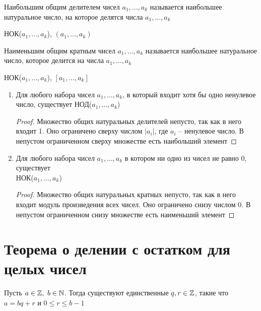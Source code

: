 \begin{definition}
	Наибольшим общим делителем чисел $a_1, ..., a_k$ называется наибольшее натуральное число, на которое делятся числа $a_1, ..., a_k$
	\begin{notation}
		НОК($a_1, ..., a_k$), $(a_1, ..., a_k)$
	\end{notation}
\end{definition}

\begin{definition}
	Наименьшим общим кратным чисел $a_1, ..., a_k$ называется наибольшее натуральное число, которое делится на числа $a_1, ..., a_k$
	\begin{notation}
		НОК($a_1, ..., a_k$), $[a_1, ..., a_k]$
	\end{notation}
\end{definition}

\begin{theorem}
	\hfill
	\begin{enumerate}
		\item Для любого набора чисел $a_1, ..., a_k$, в который входит хотя бы одно ненулевое число, существует НОД($a_1, ..., a_k$)
		\begin{proof}
			Множество общих натуральных делителей непусто, так как в него входит 1. Оно ограничено сверху числом $|a_i|$, где $a_i$ -- ненулевое число. В непустом ограниченном сверху множестве есть наибольший элемент
		\end{proof}
		\item Для любого набора чисел $a_1, ..., a_k$ в котором ни одно из чисел не равно 0, существует \\
		НОК($a_1, ..., a_k$)
		\begin{proof}
			Множество общих натуральных кратных непусто, так как в него входит модуль произведения всех чисел. Оно ограничено снизу числом 0. В непустом ограниченном снизу множестве есть наименьший элемент
		\end{proof}
	\end{enumerate}
\end{theorem}

\section{Теорема о делении с остатком для целых чисел}

\begin{theorem}
	Пусть $a \in \mathbb{Z}, ~ b \in \mathbb{N}$. Тогда существуют единственные $q, r \in \mathbb{Z}$, такие что $a = bq + r$ и $0 \le r \le b - 1$
\end{theorem}

